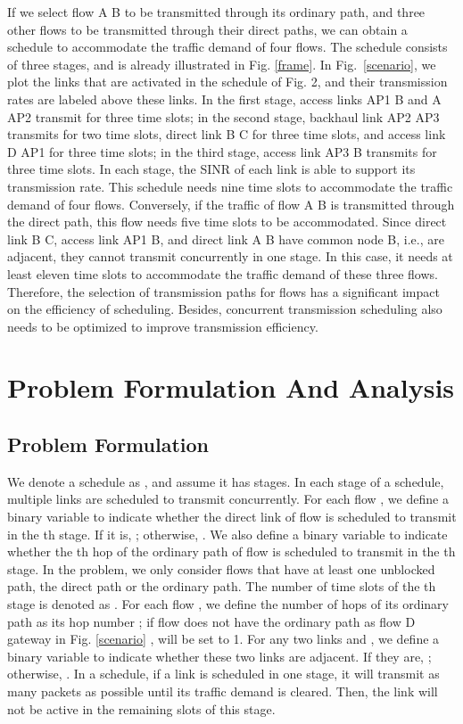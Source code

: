 \documentclass[journal]{IEEEtran}
\begin{document}
If we select flow A  B to be transmitted through its ordinary path, and three other flows to
be transmitted through their direct paths, we can obtain a schedule to accommodate the traffic
demand of four flows. The schedule consists of three stages, and is already illustrated in Fig.
\ref{frame}. In Fig.~\ref{scenario}, we plot the links that are activated in the schedule of Fig.
2, and their transmission rates are labeled above these links. In the first stage, access links AP1
 B and A  AP2 transmit for three time slots; in the second stage, backhaul link AP2 
AP3 transmits for two time slots, direct link B  C for three time slots, and access link D
 AP1 for three time slots; in the third stage, access link AP3  B transmits for three
time slots. In each stage, the SINR of each link is able to support its transmission rate. This
schedule needs nine time slots to accommodate the traffic demand of four flows. Conversely, if the
traffic of flow A  B is transmitted through the direct path, this flow needs five time slots
to be accommodated. Since direct link B  C, access link AP1  B, and direct link A  B
have common node B, i.e., are adjacent, they cannot transmit concurrently in one stage. In this
case, it needs at least eleven time slots to accommodate the traffic demand of these three flows.
Therefore, the selection of transmission paths for flows has a significant impact on the efficiency
of scheduling. Besides, concurrent transmission scheduling also needs to be optimized to improve
transmission efficiency.







\section{Problem Formulation And Analysis}\label{S4}


\subsection{Problem Formulation} \label{S4-1}

 We denote a schedule as , and
assume it has  stages. In each stage of a schedule, multiple links are scheduled to transmit
concurrently. For each flow , we define a binary variable  to indicate whether the direct
link of flow  is scheduled to transmit in the th stage. If it is, ; otherwise,
. We also define a binary variable  to indicate whether the th hop of the
ordinary path of flow  is scheduled to transmit in the th stage. In the problem, we only
consider flows that have at least one unblocked path, the direct path or the ordinary path. The
number of time slots of the th stage is denoted as . For each flow , we define the
number of hops of its ordinary path as its hop number ; if flow  does not have the ordinary
path as flow D  gateway in Fig. \ref{scenario} ,  will be set to 1. For any two links
 and , we define a binary variable  to indicate whether
these two links are adjacent. If they are, ; otherwise,
. In a schedule, if a link is scheduled in one stage, it will transmit as
many packets as possible until its traffic demand is cleared. Then, the link will not be active in
the remaining slots of this stage.
\end{document}
